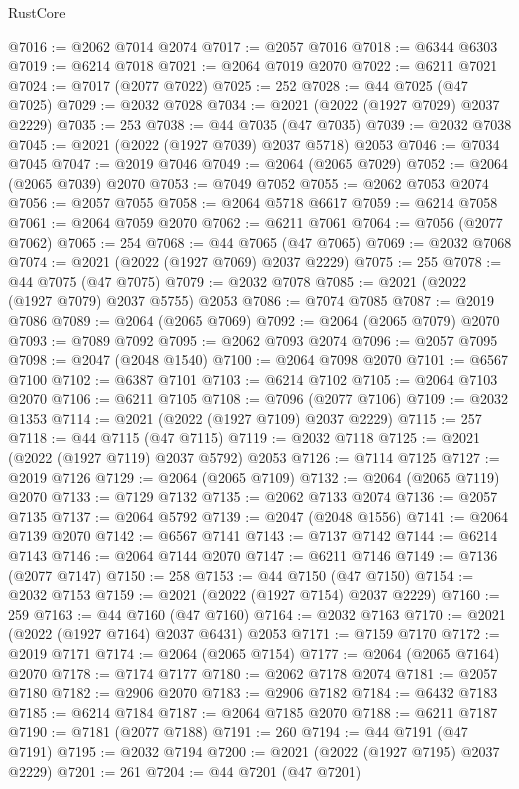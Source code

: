 \begin{lexlean}{RustCore}
\begin{coremodule}
@7016 := @2062 @7014 @2074
@7017 := @2057 @7016
@7018 := @6344 @6303
@7019 := @6214 @7018
@7021 := @2064 @7019 @2070
@7022 := @6211 @7021
@7024 := @7017 (@2077 @7022)
@7025 := 252
@7028 := @44 @7025 (@47 @7025)
@7029 := @2032 @7028
@7034 := @2021 (@2022 (@1927 @7029) @2037 @2229)
@7035 := 253
@7038 := @44 @7035 (@47 @7035)
@7039 := @2032 @7038
@7045 := @2021 (@2022 (@1927 @7039) @2037 @5718) @2053
@7046 := @7034 @7045
@7047 := @2019 @7046
@7049 := @2064 (@2065 @7029)
@7052 := @2064 (@2065 @7039) @2070
@7053 := @7049 @7052
@7055 := @2062 @7053 @2074
@7056 := @2057 @7055
@7058 := @2064 @5718 @6617
@7059 := @6214 @7058
@7061 := @2064 @7059 @2070
@7062 := @6211 @7061
@7064 := @7056 (@2077 @7062)
@7065 := 254
@7068 := @44 @7065 (@47 @7065)
@7069 := @2032 @7068
@7074 := @2021 (@2022 (@1927 @7069) @2037 @2229)
@7075 := 255
@7078 := @44 @7075 (@47 @7075)
@7079 := @2032 @7078
@7085 := @2021 (@2022 (@1927 @7079) @2037 @5755) @2053
@7086 := @7074 @7085
@7087 := @2019 @7086
@7089 := @2064 (@2065 @7069)
@7092 := @2064 (@2065 @7079) @2070
@7093 := @7089 @7092
@7095 := @2062 @7093 @2074
@7096 := @2057 @7095
@7098 := @2047 (@2048 @1540)
@7100 := @2064 @7098 @2070
@7101 := @6567 @7100
@7102 := @6387 @7101
@7103 := @6214 @7102
@7105 := @2064 @7103 @2070
@7106 := @6211 @7105
@7108 := @7096 (@2077 @7106)
@7109 := @2032 @1353
@7114 := @2021 (@2022 (@1927 @7109) @2037 @2229)
@7115 := 257
@7118 := @44 @7115 (@47 @7115)
@7119 := @2032 @7118
@7125 := @2021 (@2022 (@1927 @7119) @2037 @5792) @2053
@7126 := @7114 @7125
@7127 := @2019 @7126
@7129 := @2064 (@2065 @7109)
@7132 := @2064 (@2065 @7119) @2070
@7133 := @7129 @7132
@7135 := @2062 @7133 @2074
@7136 := @2057 @7135
@7137 := @2064 @5792
@7139 := @2047 (@2048 @1556)
@7141 := @2064 @7139 @2070
@7142 := @6567 @7141
@7143 := @7137 @7142
@7144 := @6214 @7143
@7146 := @2064 @7144 @2070
@7147 := @6211 @7146
@7149 := @7136 (@2077 @7147)
@7150 := 258
@7153 := @44 @7150 (@47 @7150)
@7154 := @2032 @7153
@7159 := @2021 (@2022 (@1927 @7154) @2037 @2229)
@7160 := 259
@7163 := @44 @7160 (@47 @7160)
@7164 := @2032 @7163
@7170 := @2021 (@2022 (@1927 @7164) @2037 @6431) @2053
@7171 := @7159 @7170
@7172 := @2019 @7171
@7174 := @2064 (@2065 @7154)
@7177 := @2064 (@2065 @7164) @2070
@7178 := @7174 @7177
@7180 := @2062 @7178 @2074
@7181 := @2057 @7180
@7182 := @2906 @2070
@7183 := @2906 @7182
@7184 := @6432 @7183
@7185 := @6214 @7184
@7187 := @2064 @7185 @2070
@7188 := @6211 @7187
@7190 := @7181 (@2077 @7188)
@7191 := 260
@7194 := @44 @7191 (@47 @7191)
@7195 := @2032 @7194
@7200 := @2021 (@2022 (@1927 @7195) @2037 @2229)
@7201 := 261
@7204 := @44 @7201 (@47 @7201)

\end{coremodule}
\end{lexlean}
